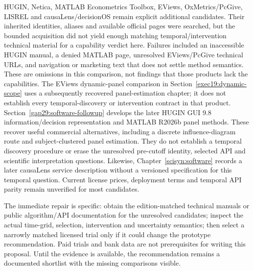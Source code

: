 HUGIN, Netica, MATLAB Econometrics Toolbox, EViews, OxMetrics/PcGive,
LISREL and causaLens/decisionOS remain explicit additional candidates.
Their inherited identities, aliases and available official pages were
searched, but the bounded acquisition did not yield enough matching
temporal/intervention technical material for a capability verdict here.
Failures included an inaccessible HUGIN manual, a denied MATLAB page,
unresolved EViews/PcGive technical URLs, and navigation or marketing
text that does not settle method semantics. These are omissions in this
comparison, not findings that those products lack the capabilities.
The EViews dynamic-panel comparison in Section~\ref{exec19:dynamic-scope}
uses a subsequently recovered panel-estimation chapter; it does not establish
every temporal-discovery or intervention contract in that product.
Section~\ref{gap29:software-followup} develops the later HUGIN GUI 9.8
information/decision representation and MATLAB R2026b panel methods. These
recover useful commercial alternatives, including a discrete influence-diagram
route and subject-clustered panel estimation. They do not establish a temporal
discovery procedure or erase the unresolved pre-cutoff identity, selected API
and scientific interpretation questions. \citep{gap29hugin,gap29matlab}
Likewise,
Chapter~\ref{scisyn:software} records a later causaLens service description
without a versioned specification for this temporal question. Current license
prices, deployment terms and temporal API parity remain unverified for most
candidates.

The immediate repair is specific: obtain the edition-matched technical
manuals or public algorithm/API documentation for the unresolved
candidates; inspect the actual time-grid, selection, intervention and
uncertainty semantics; then select a narrowly matched licensed trial
only if it could change the prototype recommendation. Paid trials and
bank data are not prerequisites for writing this proposal. Until the
evidence is available, the recommendation remains a documented shortlist
with the missing comparisons visible.

\label{exec13:commercial-temporal-end}
